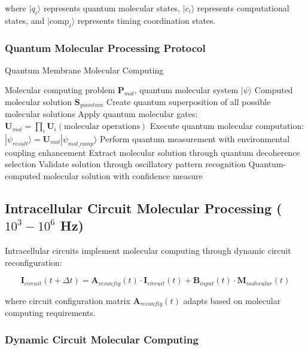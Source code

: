 \documentclass[12pt,a4paper]{article}
\begin{document}
where $|q_i\rangle$ represents quantum molecular states, $|c_i\rangle$ represents computational states, and $|\text{comp}_i\rangle$ represents timing coordination states.

\subsubsection{Quantum Molecular Processing Protocol}

\begin{algorithm}
\caption{Quantum Membrane Molecular Computing}
\begin{algorithmic}[1]
\REQUIRE Molecular computing problem $\mathbf{P}_{mol}$, quantum molecular system $|\psi\rangle$
\ENSURE Computed molecular solution $\mathbf{S}_{quantum}$
\STATE Create quantum superposition of all possible molecular solutions
\STATE Apply quantum molecular gates: $\mathbf{U}_{mol} = \prod_i \mathbf{U}_i(\text{molecular operations})$
\STATE Execute quantum molecular computation: $|\psi_{result}\rangle = \mathbf{U}_{mol}|\psi_{mol\_comp}\rangle$
\STATE Perform quantum measurement with environmental coupling enhancement
\STATE Extract molecular solution through quantum decoherence selection
\STATE Validate solution through oscillatory pattern recognition
\RETURN Quantum-computed molecular solution with confidence measure
\end{algorithmic}
\end{algorithm}

\subsection{Intracellular Circuit Molecular Processing ($10^3-10^6$ Hz)}

Intracellular circuits implement molecular computing through dynamic circuit reconfiguration:

\begin{equation}
\mathbf{I}_{circuit}(t+\Delta t) = \mathbf{A}_{reconfig}(t) \cdot \mathbf{I}_{circuit}(t) + \mathbf{B}_{input}(t) \cdot \mathbf{M}_{molecular}(t)
\end{equation}

where circuit configuration matrix $\mathbf{A}_{reconfig}(t)$ adapts based on molecular computing requirements.

\subsubsection{Dynamic Circuit Molecular Computing}
\end{document}

